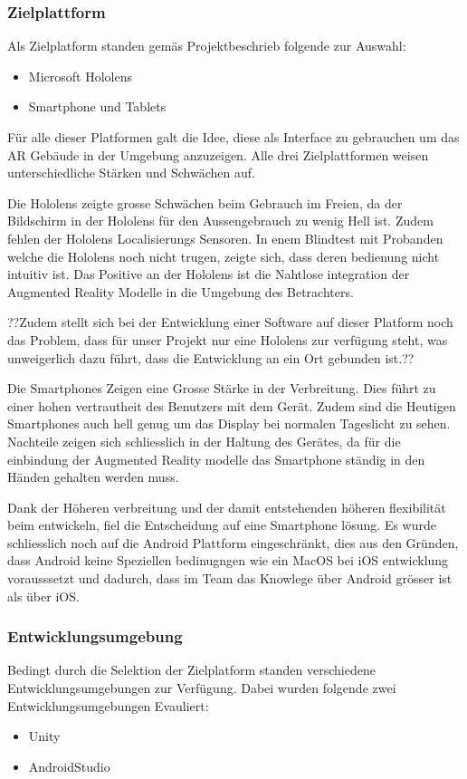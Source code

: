 \documentclass[a4paper]{scrreprt}
\begin{document}
\subsubsection{Zielplattform}
Als Zielplatform standen gemäs Projektbeschrieb folgende zur Auswahl:
\begin{itemize}
\item Microsoft Hololens
\item Smartphone und Tablets
\end{itemize}
Für alle dieser Platformen galt die Idee, diese als Interface zu gebrauchen um das AR Gebäude in der Umgebung anzuzeigen. Alle drei Zielplattformen weisen unterschiedliche Stärken und Schwächen auf.



Die Hololens zeigte grosse Schwächen beim Gebrauch im Freien, da der Bildschirm in der Hololens für den Aussengebrauch zu wenig Hell ist. Zudem fehlen der Hololens Localisierungs Sensoren. In enem Blindtest mit Probanden welche die Hololens noch nicht trugen, zeigte sich, dass deren bedienung nicht intuitiv ist.
Das Positive an der Hololens ist die Nahtlose integration der Augmented Reality Modelle in die Umgebung des Betrachters.


??Zudem stellt sich bei der Entwicklung einer Software auf dieser Platform noch das Problem, dass für unser Projekt nur eine Hololens zur verfügung steht, was unweigerlich dazu führt, dass die Entwicklung an ein Ort gebunden ist.??
 
 
 
Die Smartphones Zeigen eine Grosse Stärke in der Verbreitung. Dies führt zu einer hohen vertrautheit des Benutzers mit dem Gerät. Zudem sind die Heutigen Smartphones auch hell genug um das Display bei normalen Tageslicht zu sehen.
Nachteile zeigen sich schliesslich in der Haltung des Gerätes, da für die einbindung der Augmented Reality modelle das Smartphone ständig in den Händen gehalten werden muss. 

Dank der Höheren verbreitung und der damit entstehenden höheren flexibilität beim entwickeln, fiel die Entscheidung auf eine Smartphone lösung. Es wurde schliesslich noch auf die Android Plattform eingeschränkt, dies aus den Gründen, dass Android keine Speziellen bedinugngen wie ein MacOS bei iOS entwicklung vorausssetzt und dadurch, dass im Team das Knowlege über Android grösser ist als über iOS.

\subsubsection{Entwicklungsumgebung}
Bedingt durch die Selektion der Zielplatform standen verschiedene Entwicklungsumgebungen zur Verfügung. Dabei wurden folgende zwei Entwicklungsumgebungen Evauliert:
\begin{itemize}
\item Unity
\item AndroidStudio
\end{itemize}
\end{document}
